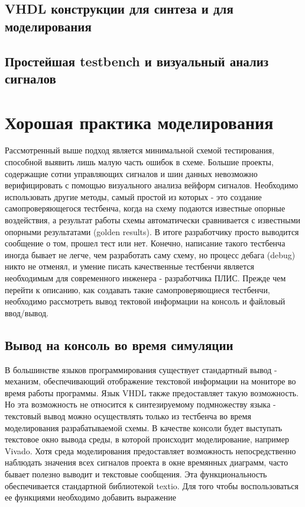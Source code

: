\subsection{VHDL конструкции для синтеза и для моделирования}

\subsection{Простейшая testbench и визуальный анализ сигналов}

\section{Хорошая практика моделирования}

Рассмотренный выше подход является минимальной схемой тестирования, способной выявить лишь малую часть ошибок в схеме. Большие проекты, содержащие сотни управляющих сигналов и шин данных невозможно верифицировать с помощью визуального анализа вейформ сигналов. Необходимо использовать другие методы, самый простой из которых - это создание самопроверяющегося тестбенча, когда на схему подаются известные опорные воздействия, а результат работы схемы автоматически сравнивается с известными опорными результатами (golden results). В итоге разработчику просто выводится сообщение о том, прошел тест или нет. Конечно, написание такого тестбенча иногда бывает не легче, чем разработать саму схему, но процесс дебага (debug) никто не отменял, и умение писать качественные тестбенчи является необходимым для современного инженера - разработчика ПЛИС. Прежде чем перейти к описанию, как создавать такие самопроверяющиеся тестбенчи, необходимо рассмотреть вывод тектовой информации на консоль и файловый ввод/вывод. 

\subsection{Вывод на консоль во время симуляции}

В большинстве языков программирования существует стандартный вывод - механизм, обеспечивающий отображение текстовой информации на мониторе во время работы программы. Язык VHDL также предоставляет такую возможность. Но эта возможность не относится к синтезируемому подмножеству языка - текстовый вывод можно осуществлять только из тестбенча во время моделирования разрабатываемой схемы. В качестве консоли будет выступать текстовое окно вывода среды, в которой происходит моделирование, например Vivado. Хотя среда моделирования предоставляет возможность непосредственно наблюдать значения всех сигналов проекта в окне времянных диаграмм, часто бывает полезно выводит и текстовые сообщения. Эта функциональность обеспечивается стандартной библиотекой textio. Для того чтобы воспользоваться ее функциями необходимо добавить выражение

